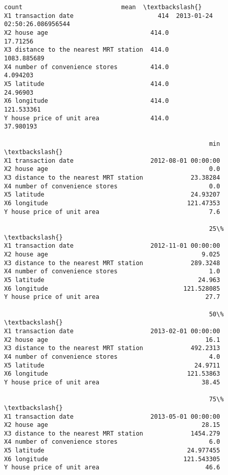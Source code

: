 \documentclass[11pt]{article}
\makeatletter
\newcommand{\boxspacing}{\kern\kvtcb@left@rule\kern\kvtcb@boxsep}
\newcommand{\prompt}[4]{
        {\ttfamily\llap{{\color{#2}[#3]:\hspace{3pt}#4}}\vspace{-\baselineskip}}
    }
\makeatother
\begin{document}
            \begin{tcolorbox}[breakable, size=fbox, boxrule=.5pt, pad at break*=1mm, opacityfill=0]
\prompt{Out}{outcolor}{220}{\boxspacing}
\begin{Verbatim}[commandchars=\\\{\}]
                                        count                           mean  \textbackslash{}
X1 transaction date                       414  2013-01-24 02:50:26.086956544
X2 house age                            414.0                       17.71256
X3 distance to the nearest MRT station  414.0                    1083.885689
X4 number of convenience stores         414.0                       4.094203
X5 latitude                             414.0                       24.96903
X6 longitude                            414.0                     121.533361
Y house price of unit area              414.0                      37.980193

                                                        min  \textbackslash{}
X1 transaction date                     2012-08-01 00:00:00
X2 house age                                            0.0
X3 distance to the nearest MRT station             23.38284
X4 number of convenience stores                         0.0
X5 latitude                                        24.93207
X6 longitude                                      121.47353
Y house price of unit area                              7.6

                                                        25\%  \textbackslash{}
X1 transaction date                     2012-11-01 00:00:00
X2 house age                                          9.025
X3 distance to the nearest MRT station             289.3248
X4 number of convenience stores                         1.0
X5 latitude                                          24.963
X6 longitude                                     121.528085
Y house price of unit area                             27.7

                                                        50\%  \textbackslash{}
X1 transaction date                     2013-02-01 00:00:00
X2 house age                                           16.1
X3 distance to the nearest MRT station             492.2313
X4 number of convenience stores                         4.0
X5 latitude                                         24.9711
X6 longitude                                      121.53863
Y house price of unit area                            38.45

                                                        75\%  \textbackslash{}
X1 transaction date                     2013-05-01 00:00:00
X2 house age                                          28.15
X3 distance to the nearest MRT station             1454.279
X4 number of convenience stores                         6.0
X5 latitude                                       24.977455
X6 longitude                                     121.543305
Y house price of unit area                             46.6


\end{Verbatim}
\end{tcolorbox}
\end{document}
